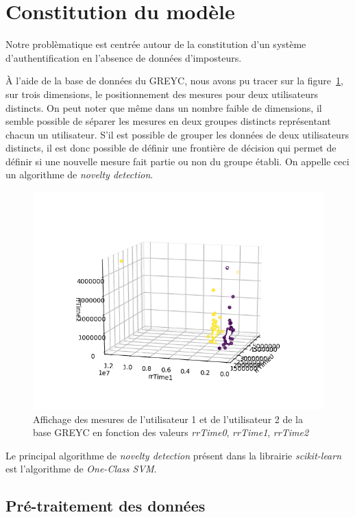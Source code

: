 \section{Constitution du modèle}

Notre problèmatique est centrée autour de la constitution d'un système d'authentification en l'absence de données d'imposteurs.

À l'aide de la base de données du GREYC, nous avons pu tracer sur la figure~\ref{3d}, sur trois dimensions, le positionnement des mesures pour deux utilisateurs distincts. On peut noter que même dans un nombre faible de dimensions, il semble possible de séparer les mesures en deux groupes distincts représentant chacun un utilisateur. S'il est possible de grouper les données de deux utilisateurs distincts, il est donc possible de définir une frontière de décision qui permet de définir si une nouvelle mesure fait partie ou non du groupe établi. On appelle ceci un algorithme de \textit{novelty detection}.

\begin{figure}[b]
    \centering
    \includegraphics[width=\linewidth]{res/3d.png}
    \caption{Affichage des mesures de l'utilisateur 1 et de l'utilisateur 2 de la base GREYC en fonction des valeurs \textit{rrTime0}, \textit{rrTime1}, \textit{rrTime2}}
    \label{3d}
\end{figure}

Le principal algorithme de \textit{novelty detection} présent dans la librairie \textit{scikit-learn} est l'algorithme de \textit{One-Class SVM}.

\subsection{Pré-traitement des données}


